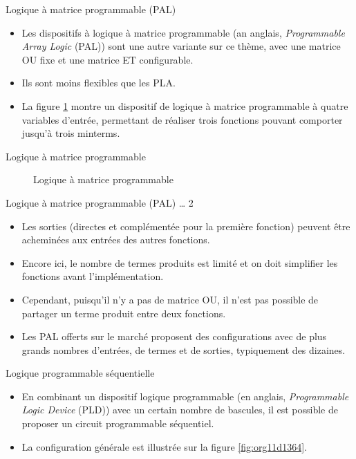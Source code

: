 \documentclass[presentation]{beamer}
\begin{document}
\begin{frame}[label={sec:org9a86108}]{Logique à matrice programmable (PAL)}
\begin{itemize}
\item Les dispositifs à \alert{logique à matrice programmable} (an anglais, \emph{Programmable Array Logic} (PAL)) sont une autre variante sur ce thème, avec une matrice OU fixe et une matrice ET configurable.

\item Ils sont moins flexibles que les PLA.

\item La figure \ref{fig:orgd98489b} montre un dispositif de logique à matrice programmable à quatre variables d'entrée, permettant de réaliser trois fonctions pouvant comporter jusqu'à trois minterms.
\end{itemize}
\end{frame}

\begin{frame}[label={sec:orga71b982}]{Logique à matrice programmable}
\begin{figure}[htbp]
\centering

\caption{\label{fig:orgd98489b}Logique à matrice programmable}
\end{figure}
\end{frame}

\begin{frame}[label={sec:orgfda13b7}]{Logique à matrice programmable (PAL) \ldots{} 2}
\begin{itemize}
\item Les sorties (directes et complémentée pour la première fonction) peuvent être acheminées aux entrées des autres fonctions.

\item Encore ici, le nombre de termes produits est limité et on doit simplifier les fonctions avant l'implémentation.

\item Cependant, puisqu'il n'y a pas de matrice OU, il n'est pas possible de partager un terme produit entre deux fonctions.

\item Les PAL offerts sur le marché proposent des configurations avec de plus grands nombres d'entrées, de termes et de sorties, typiquement des dizaines.
\end{itemize}
\end{frame}

\begin{frame}[label={sec:org908147f}]{Logique programmable séquentielle}
\begin{itemize}
\item En combinant un \alert{dispositif logique programmable} (en anglais, \emph{Programmable Logic Device} (PLD)) avec un certain nombre de bascules, il est possible de proposer un circuit programmable séquentiel.

\item La configuration générale est illustrée sur la figure \ref{fig:org11d1364}.
\end{itemize}
\end{frame}
\end{document}
